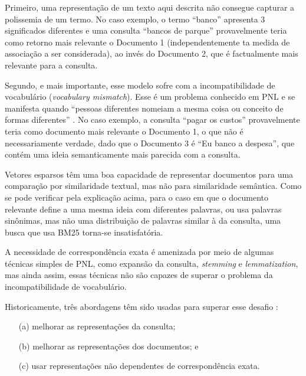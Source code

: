 \documentclass[
	12pt,				%
	openright,			%
	oneside,			%
	a4paper,			%
	english,			%
	french,				%
	spanish,			%
	brazil				%
	]{abntex2}
\begin{document}
Primeiro, uma representação de um texto aqui descrita não consegue capturar a polissemia de um termo.
No caso exemplo, o termo ``banco'' apresenta 3 significados diferentes e uma consulta ``bancos de parque''
provavelmente teria como retorno mais relevante o Documento 1 (independentemente ta medida de associação a ser considerada),
ao invés do Documento 2, que é factualmente mais relevante para a consulta.

Segundo, e mais importante, esse modelo sofre com a incompatibilidade de vocabulário (\textit{vocabulary mismatch}).
Esse é um problema conhecido em PNL e se manifesta quando ``pessoas diferentes nomeiam a mesma coisa ou conceito de formas diferentes''
.
No caso exemplo, a consulta ``pagar os custos'' provavelmente teria como documento mais relevante o Documento 1, o que não é necessariamente verdade,
dado que o Documento 3 é ``Eu banco a despesa'', que contém uma ideia semanticamente mais parecida com a consulta.

Vetores esparsos têm uma boa capacidade de representar documentos para uma comparação por similaridade textual, mas não para similaridade semântica.
Como se pode verificar pela explicação acima, para o caso em que o documento relevante define a uma mesma ideia com diferentes palavras, ou usa palavras sinônimas, mas não uma distribuição de palavras similar à da consulta, uma busca que usa BM25 torna-se insatisfatória. \cite{thakur-2021-BEIR}

A necessidade de correspondência exata é amenizada por meio de algumas técnicas simples de PNL, como expansão da consulta, \textit{stemming} e \textit{lemmatization}, mas ainda assim, essas técnicas não são capazes de superar o problema da incompatibilidade de vocabulário.


Historicamente, três abordagens têm sido usadas para superar esse desafio \cite{biblia}:
\begin{itemize}
    \item[(a)] melhorar as representações da consulta;
    \item[(b)] melhorar as representações dos documentos; e
    \item[(c)] usar representações não dependentes de correspondência exata.
\end{itemize}
\end{document}
